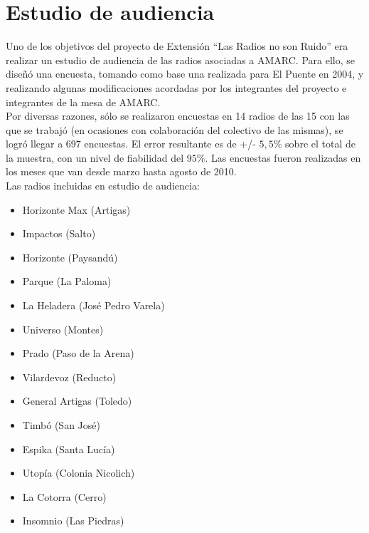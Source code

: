 \chapter{Estudio de audiencia}

\indent Uno de los objetivos del proyecto de Extensión ``Las Radios no son Ruido'' era realizar un estudio de audiencia de las radios asociadas a AMARC. Para ello, se diseñó una encuesta, tomando como base una realizada para El Puente en 2004, y realizando algunas modificaciones acordadas por los integrantes del proyecto e integrantes de la mesa de AMARC.\\

\indent Por diversas razones, sólo se realizaron encuestas en 14 radios de las 15 con las que se trabajó (en ocasiones con colaboración del colectivo de las mismas), se logró llegar a 697 encuestas. El error resultante es de +/- $5,5\%$ sobre el total de la muestra, con un nivel de fiabilidad del $95\%$. Las encuestas fueron realizadas en los meses que van desde marzo hasta agosto de 2010.\\

\indent Las radios incluidas en estudio de audiencia:
\begin{itemize}
  \item Horizonte Max (Artigas)
  \item Impactos (Salto)
  \item Horizonte (Paysandú)
  \item Parque (La Paloma)
  \item La Heladera (José Pedro Varela)
  \item Universo (Montes)
  \item Prado (Paso de la Arena)
  \item Vilardevoz (Reducto)
  \item General Artigas (Toledo)
  \item Timbó (San José)
  \item Espika (Santa Lucía)
  \item Utopía (Colonia Nicolich)
  \item La Cotorra (Cerro)
  \item Insomnio (Las Piedras)
\end{itemize}


